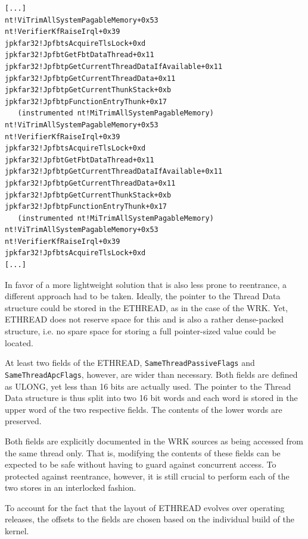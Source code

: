 \begin{lstlisting}[label={VerifierKfRaiseIrql}, caption={Stack trace illustrating recursion caused by interference of Driver Verifier with a hashtable based approach}]
[...]
nt!ViTrimAllSystemPagableMemory+0x53
nt!VerifierKfRaiseIrql+0x39
jpkfar32!JpfbtsAcquireTlsLock+0xd
jpkfar32!JpfbtGetFbtDataThread+0x11
jpkfar32!JpfbtpGetCurrentThreadDataIfAvailable+0x11 
jpkfar32!JpfbtpGetCurrentThreadData+0x11
jpkfar32!JpfbtpGetCurrentThunkStack+0xb
jpkfar32!JpfbtpFunctionEntryThunk+0x17    
   (instrumented nt!MiTrimAllSystemPagableMemory)
nt!ViTrimAllSystemPagableMemory+0x53
nt!VerifierKfRaiseIrql+0x39
jpkfar32!JpfbtsAcquireTlsLock+0xd 
jpkfar32!JpfbtGetFbtDataThread+0x11
jpkfar32!JpfbtpGetCurrentThreadDataIfAvailable+0x11
jpkfar32!JpfbtpGetCurrentThreadData+0x11 
jpkfar32!JpfbtpGetCurrentThunkStack+0xb 
jpkfar32!JpfbtpFunctionEntryThunk+0x17    
   (instrumented nt!MiTrimAllSystemPagableMemory) 
nt!ViTrimAllSystemPagableMemory+0x53
nt!VerifierKfRaiseIrql+0x39
jpkfar32!JpfbtsAcquireTlsLock+0xd 
[...]
\end{lstlisting}

In favor of a more lightweight solution that is also less prone
to reentrance, a different approach had to be taken. Ideally, the pointer
to the Thread Data structure could be stored in the ETHREAD, as in the case
of the WRK. Yet, ETHREAD does not reserve space for this and is also a
rather dense-packed structure, i.e. no spare space for storing a 
full pointer-sized value could be located.

At least two fields of the ETHREAD, \verb|SameThreadPassiveFlags| and
\verb|SameThreadApcFlags|, however, are wider than necessary. Both fields are
defined as ULONG, yet less than 16 bits are actually used. The pointer
to the Thread Data structure is thus split into two 16 bit words and each 
word is stored in the upper word of the two respective fields. The contents
of the lower words are preserved.

Both fields are explicitly documented in the WRK sources as being accessed
from the same thread only. That is, modifying the contents of these fields
can be expected to be safe without having to guard against concurrent access.
To protected against reentrance, however, it is still crucial to perform
each of the two stores in an interlocked fashion.

To account for the fact that the layout of ETHREAD evolves over operating 
releases, the offsets to the fields are chosen based on the individual
build of the kernel.

